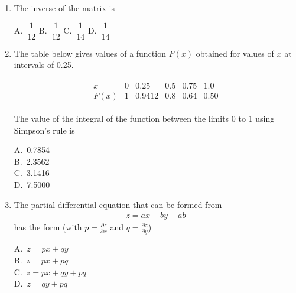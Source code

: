 \documentclass[journal,12pt,onecolumn]{IEEEtran}
\theoremstyle{remark}
\begin{document}
\begin{enumerate}
\item The inverse of the matrix  is
\hfill{}\newline

\begin{multicols}{2}
A.\ $\dfrac{1}{12}$
B.\ $\dfrac{1}{12}$
C.\ $\dfrac{1}{14}$
D.\ $\dfrac{1}{14}$
\end{multicols}

\noindent\item The table below gives values of a function $F(x)$ obtained for values of $x$ at intervals of 0.25.

\begin{align*}
\begin{array}{c|c|c|c|c|c}
x & 0 & 0.25 & 0.5 & 0.75 & 1.0 \\
\hline
F(x) & 1 & 0.9412 & 0.8 & 0.64 & 0.50
\end{array}
\end{align*}

The value of the integral of the function between the limits 0 to 1 using Simpson's rule is
\\ \hfill{}
\begin{multicols}{4}
A.\ 0.7854 \\
B.\ 2.3562 \\
C.\ 3.1416 \\
D.\ 7.5000
\end{multicols}



\noindent\item The partial differential equation that can be formed from 
\begin{align*}
z = ax + by + ab
\end{align*}
has the form (with $p = \frac{\partial z}{\partial x}$ and $q = \frac{\partial z}{\partial y}$)
\hfill{}
\begin{multicols}{4}
A.\ $z = px + qy$ \\
B.\ $z = px + pq$ \\
C.\ $z = px + qy + pq$ \\
D.\ $z = qy + pq$
\end{multicols}


\end{enumerate}
\end{document}
